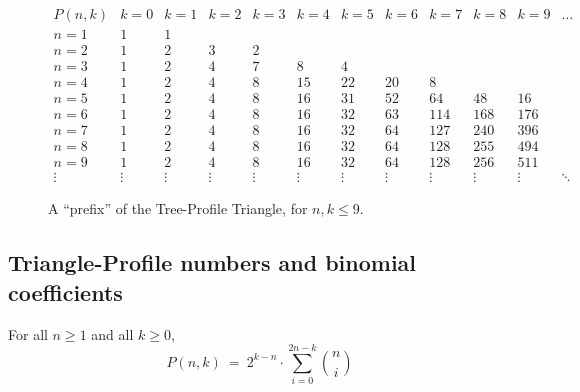 \begin{figure}[htb]
\[
\begin{array}{c||r|r|r|r|r|r|r|r|r|r|r}
P(n, k) & k=0 & k=1 & k=2 & k=3 & k=4 & k=5 & k=6 & k=7 & k=8 & k=9 & \ldots \\
\hline
\hline
n=1 &  1 &  1 &    &    &     &     &     &     &     &     \\
\hline
n=2 &  1 &  2 &  3 &  2 &     &     &     &     &     &     \\
\hline
n=3 &  1 &  2 &  4 &  7 &   8 &   4 &     &     &     &     \\
\hline
n=4 &  1 &  2 &  4 &  8 &  15 &  22 &  20 &   8 &     &     \\
\hline
n=5 &  1 &  2 &  4 &  8 &  16 &  31 &  52 &  64 & 48  &  16 \\
\hline
n=6 &  1 &  2 &  4 &  8 &  16 &  32 &  63 & 114 & 168 & 176 \\
\hline
n=7 &  1 &  2 &  4 &  8 &  16 &  32 &  64 & 127 & 240 & 396 \\
\hline
n=8 &  1 &  2 &  4 &  8 &  16 &  32 &  64 & 128 & 255 & 494 \\
\hline
n=9 &  1 &  2 &  4 &  8 &  16 &  32 &  64 & 128 & 256 & 511 \\
\hline
\vdots &\vdots &\vdots &\vdots &\vdots &\vdots &\vdots &\vdots &\vdots
&\vdots &\vdots &\ddots
\end{array}
\] 
\caption{A ``prefix'' of the Tree-Profile Triangle, for $n,k \leq 9$.}
\label{fig:TP-triangle}
\end{figure}


\subsection{Triangle-Profile numbers and binomial coefficients}

\begin{prop}
\label{thm:TP=sum-of-bincoeff}
For all $n \geq 1$ and all $k \geq 0$,
\begin{equation}
\label{eq:TP=sum-of-bincoeff}
P(n,k) \ = \ 2^{k-n} \cdot \sum_{i=0}^{2n-k} {n \choose i}
\end{equation}
\end{prop}

